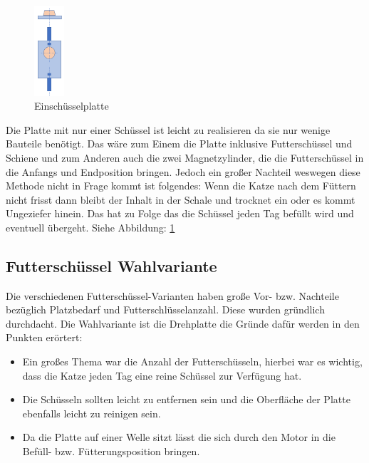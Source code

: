 \begin{figure}
\vspace{-20pt}
  \begin{center}
    \includegraphics[width=0.10\textwidth]{Bilder/Powerpoint/Einschuessel_platte}
  \end{center}
  \caption{Einschüsselplatte}
  \label{Schüssel Eins}
  \vspace{-10pt}
\end{figure}

Die Platte mit nur einer Schüssel ist leicht zu realisieren da sie nur wenige Bauteile benötigt. Das wäre zum Einem die Platte inklusive Futterschüssel und Schiene und zum Anderen auch die zwei Magnetzylinder, die die Futterschüssel in die Anfangs und Endposition bringen. Jedoch ein großer Nachteil weswegen diese Methode nicht in Frage kommt ist folgendes: Wenn die Katze nach dem Füttern nicht frisst dann bleibt der Inhalt in der Schale und trocknet ein oder es kommt Ungeziefer hinein. Das hat zu Folge das die Schüssel jeden Tag befüllt wird und eventuell übergeht. Siehe Abbildung: \ref{Schüssel Eins} 

\subsection{Futterschüssel Wahlvariante}

Die verschiedenen Futterschüssel-Varianten haben große Vor- bzw. Nachteile bezüglich Platzbedarf und Futterschlüsselanzahl. Diese wurden gründlich durchdacht. Die Wahlvariante ist die Drehplatte die Gründe dafür werden in den Punkten erörtert: 

\begin{itemize}
\item Ein großes Thema war die Anzahl der Futterschüsseln, hierbei war es wichtig, dass die Katze jeden Tag eine reine Schüssel zur Verfügung hat.
\item Die Schüsseln sollten leicht zu entfernen sein und die Oberfläche der Platte ebenfalls leicht zu reinigen sein.
\item Da die Platte auf einer Welle sitzt lässt die sich durch den Motor in die Befüll- bzw. Fütterungsposition bringen.
\end{itemize} 

